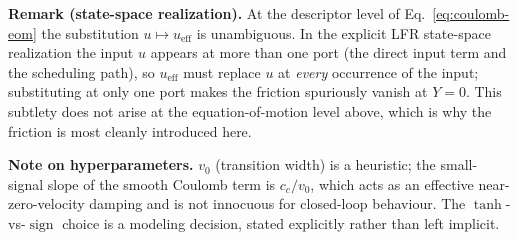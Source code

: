 \documentclass[11pt]{article}
\newcommand{\sgn}{\operatorname{sign}}
\newcommand{\ueff}{u_{\mathrm{eff}}}
\begin{document}
\medskip\noindent\textbf{Remark (state-space realization).}\quad
At the descriptor level of Eq.~\eqref{eq:coulomb-eom} the substitution
$u \mapsto \ueff$ is unambiguous. In the explicit LFR state-space realization the input
$u$ appears at more than one port (the direct input term and the scheduling path), so
$\ueff$ must replace $u$ at \emph{every} occurrence of the input; substituting at only one
port makes the friction spuriously vanish at $Y=0$. This subtlety does not arise at the
equation-of-motion level above, which is why the friction is most cleanly introduced here.

\medskip\noindent\textbf{Note on hyperparameters.}\quad
$v_0$ (transition width) is a heuristic; the small-signal slope of the smooth Coulomb term
is $c_c/v_0$, which acts as an effective near-zero-velocity damping and is not innocuous
for closed-loop behaviour. The $\tanh$-vs-$\sgn$ choice is a modeling decision, stated
explicitly rather than left implicit.
\end{document}
